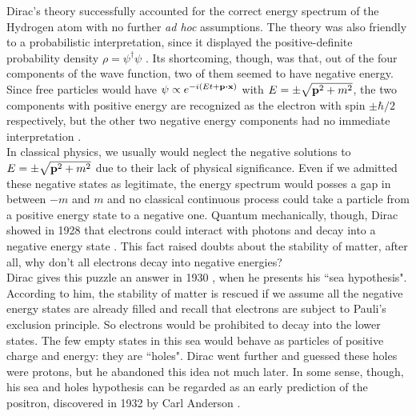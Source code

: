 Dirac's theory successfully accounted for the correct energy spectrum of the Hydrogen atom with no further \textit{ad hoc} assumptions. The theory was also friendly to a probabilistic interpretation, since it displayed the positive-definite probability density $\rho=\psi^\dagger\psi$ \cite{weinberg1995quantum}. Its shortcoming, though, was that, out of the four components of the wave function, two of them seemed to have negative energy. Since free particles would have $\psi\propto e^{-i(Et+\vb{p}\vdot\vb{x})}$ with $E=\pm\sqrt{\vb{p}^2+m^2}$, the two components with positive energy are recognized as the electron with spin $\pm\hbar/2$ respectively, but the other two negative energy components had no immediate interpretation \cite{weinberg1995quantum}.\\

In classical physics, we usually would neglect the negative solutions to $E=\pm\sqrt{\vb{p}^2+m^2}$ due to their lack of physical significance. Even if we admitted these negative states as legitimate, the energy spectrum would posses a gap in between $-m$ and $m$ and no classical continuous process could take a particle from a positive energy state to a negative one. Quantum mechanically, though, Dirac showed in 1928 that electrons could interact with photons and decay into a negative energy state \cite{dirac28}. This fact raised doubts about the stability of matter, after all, why don't all electrons decay into negative energies?\\

Dirac gives this puzzle an answer in 1930 \cite{dirac22}, when he presents his ``sea hypothesis". According to him, the stability of matter is rescued if we assume all the negative energy states are already filled and recall that electrons are subject to Pauli's exclusion principle. So electrons would be prohibited to decay into the lower states. The few empty states in this sea would behave as particles of positive charge and energy: they are ``holes". Dirac went further and guessed these holes were protons, but he abandoned this idea not much later. In some sense, though, his sea and holes hypothesis can be regarded as an early prediction of the positron, discovered in 1932 by Carl Anderson \cite{weinberg1995quantum}.\\

